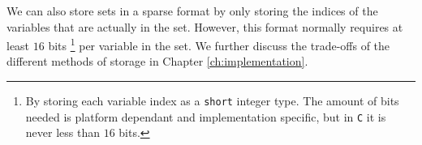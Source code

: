 We can also store sets in a sparse
format by only storing the indices of the variables that are actually in the
set.
However, this format normally requires at least $16$ bits\nolinebreak
\footnote{By storing each variable index as a \texttt{short} integer type.
The amount of bits needed is platform dependant and implementation specific,
but in \texttt{C} it is never less than $16$ bits.}
per variable in the set.
We further discuss the trade-offs of the different methods of storage in
Chapter \ref{ch:implementation}.
